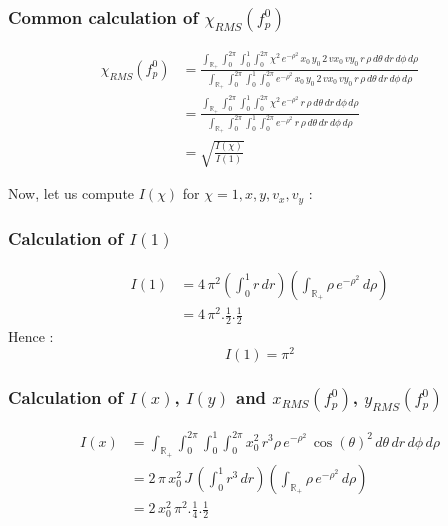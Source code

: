\documentclass[10pt]{article}
\begin{document}
\subsubsection{Common calculation of $\chi_{RMS}(f_p^0)$}

\begin{align*}
\chi_{RMS}(f_p^0) &= \frac{ \int_{\mathbb{R}_{+}}\int_0^{2\pi}\int_0^1\int_0^{2\pi} \chi^{2}\, e^{-\rho^{2}}\,x_0\,y_0\,2\,vx_0\,vy_0\,r\,\rho\,d\theta\,dr\,d\phi\,d\rho}{\int_{\mathbb{R}_{+}}\int_0^{2\pi}\int_0^1\int_0^{2\pi} e^{-\rho^{2}}\,x_0\,y_0\,2\,vx_0\,vy_0\,r\,\rho\,d\theta\,dr\,d\phi\,d\rho} \\
&= \frac{ \int_{\mathbb{R}_{+}}\int_0^{2\pi}\int_0^1\int_0^{2\pi} \chi^{2}\, e^{-\rho^{2}}\,r\,\rho\,d\theta\,dr\,d\phi\,d\rho}{\int_{\mathbb{R}_{+}}\int_0^{2\pi}\int_0^1\int_0^{2\pi} e^{-\rho^{2}}\,r\,\rho\,d\theta\,dr\,d\phi\,d\rho} \\
&= \sqrt{\frac{I(\chi)}{I(1)}}
\end{align*}

Now, let us compute $I(\chi)$ for $\chi = 1,x,y,v_x,v_y$ :

\subsubsection{Calculation of $I(1)$}

\begin{align*}
I(1) &= 4\,\pi^{2} \left(\int_{0}^{1} r\,dr\right) \left(\int_{\mathbb{R}_{+}}\rho\,e^{-\rho^{2}}\,d\rho \right) \\
&= 4\,\pi^{2}.\frac{1}{2}.\frac{1}{2}
\end{align*}
Hence :
$$\boxed{I(1) = \pi^{2}}$$

\subsubsection{Calculation of $I(x)$, $I(y)$ and $x_{RMS}(f_p^0)$, $y_{RMS}(f_p^0)$}

\begin{align*}
I(x) &= \int_{\mathbb{R}_{+}}\int_0^{2\pi}\int_0^1\int_0^{2\pi} x_0^2\,r^3\rho\, e^{-\rho^{2}}\,\cos(\theta)^2\,d\theta\,dr\,d\phi\,d\rho \\
&= 2\,\pi\,x_0^2\,J\,\left(\int_{0}^{1} r^3\,dr\right) \left(\int_{\mathbb{R}_{+}}\rho\,e^{-\rho^{2}}\,d\rho \right) \\
&= 2\,x_0^2\,\pi^{2}.\frac{1}{4}.\frac{1}{2}
\end{align*}
\end{document}
